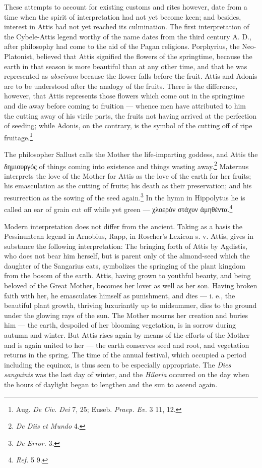 \documentclass[a4paper, 11pt, oneside, polutonikogreek, english]{article}
\begin{document}
These attempts to account for existing customs and rites however, date from a time when the spirit of interpretation had not yet become keen; and besides, interest in Attis had not yet reached its culmination. The first interpretation of the Cybele-Attis legend worthy of the name dates from the third century A. D., after philosophy had come to the aid of the Pagan religions. Porphyrius, the Neo-Platonist, believed that Attis signified the flowers of the springtime, because the earth in that season is more beautiful than at any other time, and that he was represented as \emph{abscisum} because the flower falls before the fruit. Attis and Adonis are to be understood after the analogy of the fruits. There is the difference, however, that Attis represents those flowers which come out in the springtime and die away before coming to fruition --- whence men have attributed to him the cutting away of his virile parts, the fruits not having arrived at the perfection of seeding; while Adonis, on the contrary, is the symbol of the cutting off of ripe fruitage.\footnote{Aug. \emph{De Civ. Dei} 7, 25; Euseb. \emph{Praep. Ev.} 3 11, 12.}

The philosopher Sallust calls the Mother the life-imparting goddess, and Attis the δημιουργός of things coming into existence and things wasting away.\footnote{\emph{De Diis et Mundo} 4.} Maternus interprets the love of the Mother for Attis as the love of the earth for her fruits; his emasculation as the cutting of fruits; his death as their preservation; and his resurrection as the sowing of the seed again.\footnote{\emph{De Error.} 3.} In the hymn in Hippolytus he is called an ear of grain cut off while yet green --- χλοερὸν στάχυν ἀμηθέντα.\footnote{\emph{Ref.} 5 9.}

Modern interpretation does not differ from the ancient. Taking as a basis the Pessinuntean legend in Arnobius, Rapp, in Roscher's Lexicon s. v. Attis, gives in substance the following interpretation: The bringing forth of Attis by Agdistis, who does not bear him herself, but is parent only of the almond-seed which the daughter of the Sangarius eats, symbolizes the springing of the plant kingdom from the bosom of the earth. Attis, having grown to youthful beauty, and being beloved of the Great Mother, becomes her lover as well as her son. Having broken faith with her, he emasculates himself as punishment, and dies --- i. e., the beautiful plant growth, thriving luxuriantly up to midsummer, dies to the ground under the glowing rays of the sun. The Mother mourns her creation and buries him --- the earth, despoiled of her blooming vegetation, is in sorrow during autumn and winter. But Attis rises again by means of the efforts of the Mother and is again united to her --- the earth conserves seed and root, and vegetation returns in the spring. The time of the annual festival, which occupied a period including the equinox, is thus seen to be especially appropriate. The \emph{Dies sanguinis} was the last day of winter, and the \emph{Hilaria} occurred on the day when the hours of daylight began to lengthen and the sun to ascend again.
\end{document}
